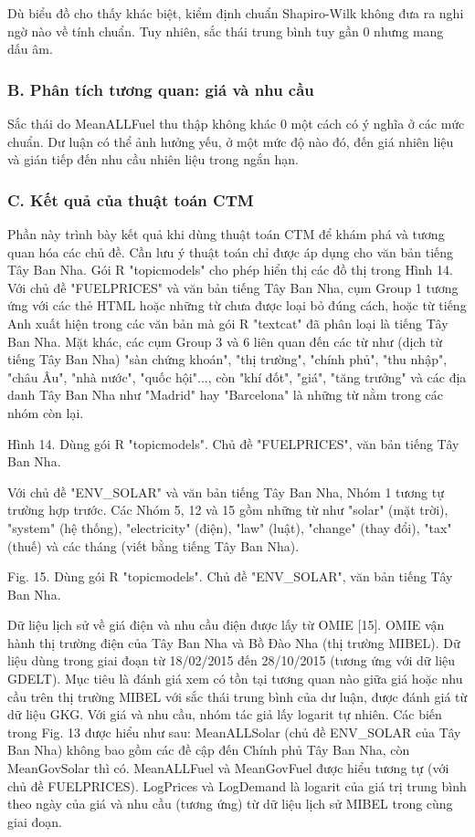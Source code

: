 Dù biểu đồ cho thấy khác biệt, kiểm định chuẩn Shapiro-Wilk không đưa ra nghi ngờ nào về tính chuẩn. Tuy nhiên, sắc thái trung bình tuy gần 0 nhưng mang dấu âm.

\subsubsection{B. Phân tích tương quan: giá và nhu cầu}

Sắc thái do MeanALLFuel thu thập không khác 0 một cách có ý nghĩa ở các mức chuẩn. Dư luận có thể ảnh hưởng yếu, ở một mức độ nào đó, đến giá nhiên liệu và gián tiếp đến nhu cầu nhiên liệu trong ngắn hạn.

\subsubsection{C. Kết quả của thuật toán CTM}

Phần này trình bày kết quả khi dùng thuật toán CTM để khám phá và tương quan hóa các chủ đề. Cần lưu ý thuật toán chỉ được áp dụng cho văn bản tiếng Tây Ban Nha. Gói R "topicmodels" cho phép hiển thị các đồ thị trong Hình 14. Với chủ đề "FUELPRICES" và văn bản tiếng Tây Ban Nha, cụm Group 1 tương ứng với các thẻ HTML hoặc những từ chưa được loại bỏ đúng cách, hoặc từ tiếng Anh xuất hiện trong các văn bản mà gói R "textcat" đã phân loại là tiếng Tây Ban Nha. Mặt khác, các cụm Group 3 và 6 liên quan đến các từ như (dịch từ tiếng Tây Ban Nha) "sàn chứng khoán", "thị trường", "chính phủ", "thu nhập", "châu Âu", "nhà nước", "quốc hội"..., còn "khí đốt", "giá", "tăng trưởng" và các địa danh Tây Ban Nha như "Madrid" hay "Barcelona" là những từ nằm trong các nhóm còn lại.

Hình 14. Dùng gói R "topicmodels". Chủ đề "FUELPRICES", văn bản tiếng Tây Ban Nha.

Với chủ đề "ENV\_SOLAR" và văn bản tiếng Tây Ban Nha, Nhóm 1 tương tự trường hợp trước. Các Nhóm 5, 12 và 15 gồm những từ như "solar" (mặt trời), "system" (hệ thống), "electricity" (điện), "law" (luật), "change" (thay đổi), "tax" (thuế) và các tháng (viết bằng tiếng Tây Ban Nha).

Fig. 15. Dùng gói R "topicmodels". Chủ đề "ENV\_SOLAR", văn bản tiếng Tây Ban Nha.

Dữ liệu lịch sử về giá điện và nhu cầu điện được lấy từ OMIE {[}15{]}. OMIE vận hành thị trường điện của Tây Ban Nha và Bồ Đào Nha (thị trường MIBEL). Dữ liệu dùng trong giai đoạn từ 18/02/2015 đến 28/10/2015 (tương ứng với dữ liệu GDELT). Mục tiêu là đánh giá xem có tồn tại tương quan nào giữa giá hoặc nhu cầu trên thị trường MIBEL với sắc thái trung bình của dư luận, được đánh giá từ dữ liệu GKG. Với giá và nhu cầu, nhóm tác giả lấy logarit tự nhiên. Các biến trong Fig. 13 được hiểu như sau: MeanALLSolar (chủ đề ENV\_SOLAR của Tây Ban Nha) không bao gồm các đề cập đến Chính phủ Tây Ban Nha, còn MeanGovSolar thì có. MeanALLFuel và MeanGovFuel được hiểu tương tự (với chủ đề FUELPRICES). LogPrices và LogDemand là logarit của giá trị trung bình theo ngày của giá và nhu cầu (tương ứng) từ dữ liệu lịch sử MIBEL trong cùng giai đoạn.

